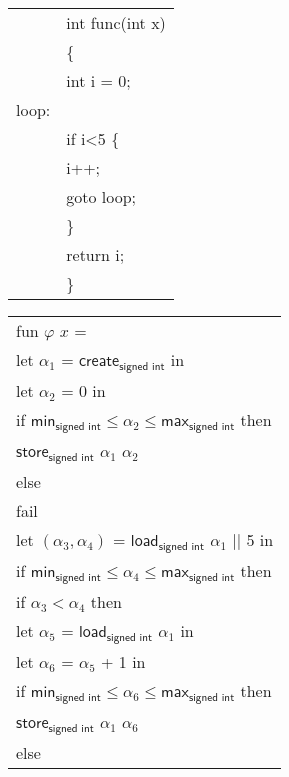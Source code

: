 \documentclass[12pt, a4paper]{article}
\newcommand{\syn}[1]{\textsf{#1}} %
\begin{document}
{\footnotesize
{
\begin{tabular}{ll}
& int func(int x)\\
& \{\\
& {\color{red}\quad int i = 0;}\\
loop: & \\
& {\color{green}\quad if i<5} \{\\
& {\color{blue}\quad \quad i++;}\\
& {\color{magenta}\quad \quad goto loop;}\\
& \quad \}\\
& {\color{orange}\quad return i;}\\
& \}
\end{tabular}
}
\vline
\begin{tabular}{l}
\syn{fun} $\varphi$ $x$ =\\
{\color{red} \quad \syn{let} $\alpha_1$ = $\syn{create}_\textsf{signed int}$ \syn{in}}\\
{\color{red} \quad \syn{let} $\alpha_2$ = 0 \syn{in}}\\
{\color{red} \quad \syn{if} $\syn{min}_\textsf{signed int} \le \alpha_2 \le \syn{max}_\textsf{signed int}$ \syn{then}}\\
{\color{red} \quad \quad $\syn{store}_\textsf{signed int}$ $\alpha_1$ $\alpha_2$}\\
{\color{red} \quad \syn{else}}\\
{\color{red} \quad \quad \syn{fail}}\\
{\color{green} \quad \syn{let} $(\alpha_3, \alpha_4)$ = $\syn{load}_\textsf{signed int}$ $\alpha_1$ || 5 \syn{in}}\\
{\color{green} \quad \syn{if} $\syn{min}_\textsf{signed int} \le \alpha_4 \le \syn{max}_\textsf{signed int}$ \syn{then}}\\
{\color{green} \quad \quad \syn{if} $\alpha_3 < \alpha_4$ \syn{then}}\\
{\color{blue} \quad \quad \quad \syn{let} $\alpha_5$ = $\syn{load}_\textsf{signed int}$ $\alpha_1$ \syn{in}}\\
{\color{blue} \quad \quad \quad \syn{let} $\alpha_6$ = $\alpha_5$ + 1 \syn{in}}\\
{\color{blue} \quad \quad \quad \syn{if} $\syn{min}_\textsf{signed int} \le \alpha_6 \le \syn{max}_\textsf{signed int}$ \syn{then}}\\
{\color{blue} \quad \quad \quad \quad $\syn{store}_\textsf{signed int}$ $\alpha_1$ $\alpha_6$}\\
{\color{blue} \quad \quad \quad  \syn{else}}\\

\end{tabular}}
\end{document}
